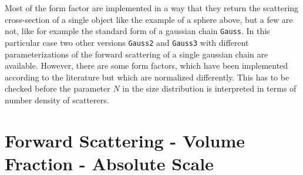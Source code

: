 Most of the form factor are implemented in a way that they return
the scattering cross-section of a single object like the example of
a sphere above, but a few are not, like for example the standard
form of a gaussian chain \texttt{Gauss}. In this particular case two
other versions \texttt{Gauss2} and \texttt{Gauss3} with different
parameterizations of the forward scattering of a single gaussian
chain are available. However, there are some form factors, which
have been implemented according to the literature but which are
normalized differently. This has to be checked before the parameter
$N$ in the size distribution is interpreted in terms of number
density of scatterers.

\section{Forward Scattering - Volume Fraction - Absolute Scale}
\label{sec:contrast-concentration-I(0)}

